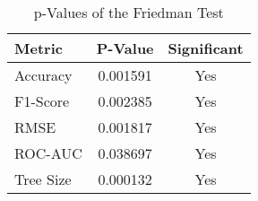 
    \begin{table}[H]
        \centering
        \renewcommand{\arraystretch}{1.2}
        \caption{p-Values of the Friedman Test}
        \label{tab:RQ_Comparison_friedman}
    \begin{tabular}{lcc}
\toprule
Metric & P-Value & Significant \\
\midrule
Accuracy & 0.001591 & Yes \\
F1-Score & 0.002385 & Yes \\
RMSE & 0.001817 & Yes \\
ROC-AUC & 0.038697 & Yes \\
Tree Size & 0.000132 & Yes \\
\bottomrule
\end{tabular}

        
    \end{table}
    